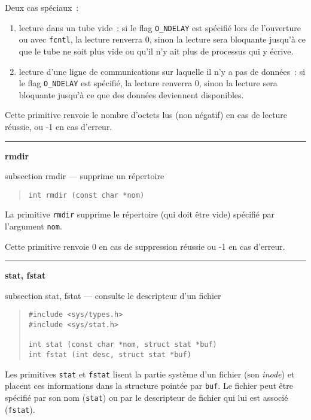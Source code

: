\documentclass [twoside] {report}
\newcommand {\primitive} [1]
    {
	{\large \bf #1}
	\addcontentsline {toc} {subsection} {#1}
    }
\newcommand {\separation}
    {
	\vspace {7mm}
	\nopagebreak
	\hrule
    }
\begin{document}
Deux cas spéciaux~:

\begin {enumerate}
    \item lecture dans un tube vide~: si le flag {\tt O\_NDELAY}
	est spécifié lors de l'ouverture ou avec {\tt fcntl},
	la lecture renverra 0, sinon la lecture
	sera bloquante jusqu'à ce que le tube ne soit plus
	vide ou qu'il n'y ait plus de processus qui y écrive.
    \item lecture d'une ligne de communications sur
	laquelle il n'y a pas de données~: si le flag {\tt O\_NDELAY}
	est spécifié, la lecture renverra 0, sinon la lecture
	sera bloquante jusqu'à ce que des données
	deviennent disponibles.
\end {enumerate}

Cette primitive renvoie le nombre d'octets lus
(non négatif) en cas de lecture
réussie, ou -1 en cas d'erreur.




\separation
\primitive {rmdir} --- supprime un répertoire

\begin {quote}
\begin {verbatim}
int rmdir (const char *nom)
\end{verbatim}
\end {quote}

La primitive {\tt rmdir} supprime le répertoire (qui doit être vide)
spécifié par l'argument {\tt nom}.

Cette primitive renvoie 0 en cas de suppression réussie
ou -1 en cas d'erreur.




\separation
\primitive {stat, fstat} --- consulte le descripteur d'un fichier
    \label {stat}

\begin {quote}
\begin {verbatim}
#include <sys/types.h>
#include <sys/stat.h>

int stat (const char *nom, struct stat *buf)
int fstat (int desc, struct stat *buf)
\end{verbatim}
\end {quote}

Les primitives {\tt stat} et {\tt fstat} lisent la partie système d'un
fichier (son {\it inode}) et placent ces informations dans la structure
pointée par {\tt buf}. Le fichier peut être spécifié par son nom
({\tt stat}) ou par le descripteur de fichier qui lui est associé
({\tt fstat}).
\end{document}
